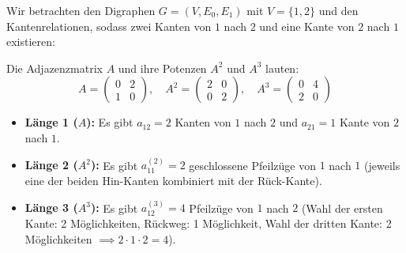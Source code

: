 \begin{math-stroke}
Wir betrachten den Digraphen $G = (V, E_0, E_1)$ mit $V = \{1, 2\}$ und den Kantenrelationen, sodass zwei Kanten von $1$ nach $2$ und eine Kante von $2$ nach $1$ existieren:

\begin{center}
\end{center}

Die Adjazenzmatrix $A$ und ihre Potenzen $A^2$ und $A^3$ lauten:
\[
A = \begin{pmatrix}
0 & 2 \\
1 & 0
\end{pmatrix}, \quad
A^2 = \begin{pmatrix}
2 & 0 \\
0 & 2
\end{pmatrix}, \quad
A^3 = \begin{pmatrix}
0 & 4 \\
2 & 0
\end{pmatrix}
\]

\begin{explanation-of-steps}
\begin{itemize}
    \item \textbf{Länge 1 ($A$):} Es gibt $a_{12} = 2$ Kanten von $1$ nach $2$ und $a_{21} = 1$ Kante von $2$ nach $1$.
    \item \textbf{Länge 2 ($A^2$):} Es gibt $a_{11}^{(2)} = 2$ geschlossene Pfeilzüge von $1$ nach $1$ (jeweils eine der beiden Hin-Kanten kombiniert mit der Rück-Kante).
    \item \textbf{Länge 3 ($A^3$):} Es gibt $a_{12}^{(3)} = 4$ Pfeilzüge von $1$ nach $2$ (Wahl der ersten Kante: 2 Möglichkeiten, Rückweg: 1 Möglichkeit, Wahl der dritten Kante: 2 Möglichkeiten $\implies 2 \cdot 1 \cdot 2 = 4$).
\end{itemize}
\end{explanation-of-steps}
\end{math-stroke}

